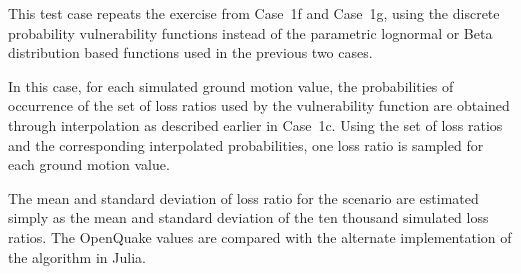 This test case repeats the exercise from Case~1f and Case~1g, using the discrete probability vulnerability functions instead of the parametric lognormal or Beta distribution based functions used in the previous two cases.

In this case, for each simulated ground motion value, the probabilities of occurrence of the set of loss ratios used by the vulnerability function are obtained through interpolation as described earlier in Case~1c. Using the set of loss ratios and the corresponding interpolated probabilities, one loss ratio is sampled for each ground motion value.

The mean and standard deviation of loss ratio for the scenario are estimated simply as the mean and standard deviation of the ten thousand simulated loss ratios. The OpenQuake values are compared with the alternate implementation of the algorithm in Julia.